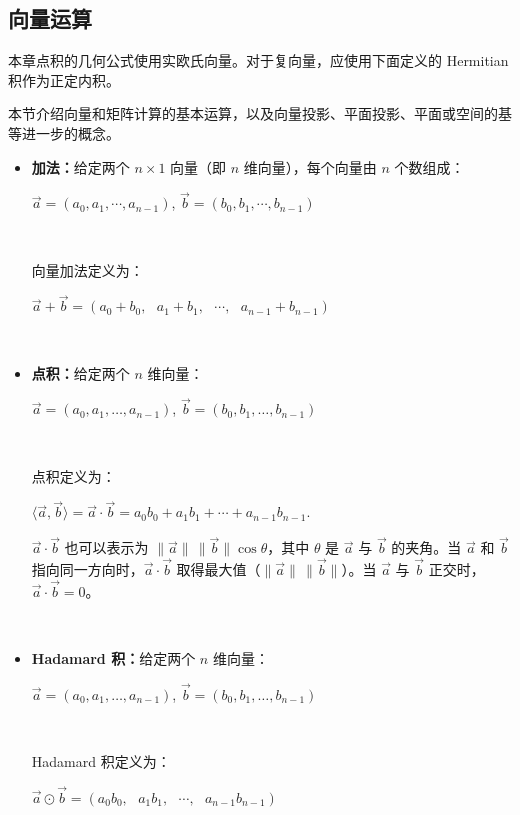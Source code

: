 

\subsection{向量运算}
\label{subsec:vector-arithmetic}

本章点积的几何公式使用实欧氏向量。对于复向量，应使用下面定义的 Hermitian 积作为正定内积。

本节介绍向量和矩阵计算的基本运算，以及向量投影、平面投影、平面或空间的基等进一步的概念。


\begin{tcolorbox}[title={\textbf{\tboxdef{\ref*{subsec:vector-arithmetic}} 向量运算}}]

\begin{itemize}
\item \textbf{加法：}给定两个 $n \times 1$ 向量（即 $n$ 维向量），每个向量由 $n$ 个数组成：

$\vec{a} = (a_0, a_1,\cdots, a_{n-1})$, $\vec{b} = (b_0, b_1,\cdots, b_{n-1})$

$ $

向量加法定义为：

$ \vec{a} + \vec{b} = (a_0 + b_0, \text{ } a_1  +  b_1, \text{ }\cdots, \text{ } a_{n-1}  +  b_{n-1})$

$ $

\item \textbf{点积：}给定两个 $n$ 维向量：

$\vec{a} = (a_0, a_1,\ldots, a_{n-1})$, $\vec{b} = (b_0, b_1,\ldots, b_{n-1})$

$ $

点积定义为：

$\langle \vec{a}, \vec{b} \rangle =  \vec{a} \cdot \vec{b} = a_0 b_0 + a_1 b_1 +\cdots + a_{n-1} b_{n-1}$.

$\vec{a} \cdot \vec{b}$ 也可以表示为 $\|\vec{a}\|\,\|\vec{b}\|\cos\theta$，其中 $\theta$ 是 $\vec{a}$ 与 $\vec{b}$ 的夹角。当 $\vec{a}$ 和 $\vec{b}$ 指向同一方向时，$\vec{a}\cdot\vec{b}$ 取得最大值（$\|\vec{a}\|\,\|\vec{b}\|$）。当 $\vec{a}$ 与 $\vec{b}$ 正交时，$\vec{a}\cdot\vec{b} = 0$。

$ $


\item \textbf{Hadamard 积：}给定两个 $n$ 维向量：

$\vec{a} = (a_0, a_1,\ldots, a_{n-1})$, $\vec{b} = (b_0, b_1,\ldots, b_{n-1})$

$ $

Hadamard 积定义为：

$\vec{a} \odot \vec{b} = (a_0 b_0, \text{ } a_1 b_1, \text{ }\cdots, \text{ } a_{n-1} b_{n-1})$


\end{itemize}
\end{tcolorbox}
